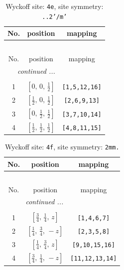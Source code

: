 \documentclass[fleqn,8pt]{jsarticle}
\begin{document}
\begin{longtable}{ccc}
\caption{Wyckoff site: {\tt 4e}, site symmetry: {\tt ..2'/m'}}
 \\
 \hline \hline
No. & position & mapping \\ \hline \endfirsthead

\multicolumn{2}{l}{\tablename\ \thetable{}} \\
 \hline \hline
No. & position & mapping \\ \hline \endhead

 \hline \hline
\multicolumn{2}{r}{\footnotesize\it continued ...} \\ \endfoot

 \hline \hline
\multicolumn{2}{r}{} \\ \endlastfoot

1 & $\left[ 0,\, 0,\, \frac{1}{2} \right]$ & {\tt [1,5,12,16]} \\ \hline
2 & $\left[ \frac{1}{2},\, 0,\, \frac{1}{2} \right]$ & {\tt [2,6,9,13]} \\ \hline
3 & $\left[ 0,\, \frac{1}{2},\, \frac{1}{2} \right]$ & {\tt [3,7,10,14]} \\ \hline
4 & $\left[ \frac{1}{2},\, \frac{1}{2},\, \frac{1}{2} \right]$ & {\tt [4,8,11,15]} \\
\end{longtable}
\renewcommand{\arraystretch}{1.2}
\begin{longtable}{ccc}
\caption{Wyckoff site: {\tt 4f}, site symmetry: {\tt 2mm.}}
 \\
 \hline \hline
No. & position & mapping \\ \hline \endfirsthead

\multicolumn{2}{l}{\tablename\ \thetable{}} \\
 \hline \hline
No. & position & mapping \\ \hline \endhead

 \hline \hline
\multicolumn{2}{r}{\footnotesize\it continued ...} \\ \endfoot

 \hline \hline
\multicolumn{2}{r}{} \\ \endlastfoot

1 & $\left[ \frac{3}{4},\, \frac{1}{4},\, z \right]$ & {\tt [1,4,6,7]} \\ \hline
2 & $\left[ \frac{1}{4},\, \frac{3}{4},\, - z \right]$ & {\tt [2,3,5,8]} \\ \hline
3 & $\left[ \frac{1}{4},\, \frac{3}{4},\, z \right]$ & {\tt [9,10,15,16]} \\ \hline
4 & $\left[ \frac{3}{4},\, \frac{1}{4},\, - z \right]$ & {\tt [11,12,13,14]} \\
\end{longtable}
\end{document}
